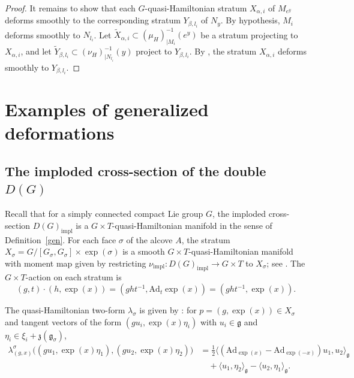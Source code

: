 \documentclass[reqno]{amsart}
\theoremstyle{plain}
\theoremstyle{definition}
\begin{document}
\begin{proof}
It remains to show that each $G$-quasi-Hamiltonian stratum $X_{\alpha,i}$ of $M_{e^y}$ deforms smoothly to the corresponding stratum $Y_{\beta,l_i}$ of $N_y$. By hypothesis, $M_i$ deforms smoothly to $N_{l_i}$. Let $\tilde{X}_{\alpha,i} \subset (\mu_H)_{|M_i}^{-1}(e^y)$ be a stratum projecting to $X_{\alpha,i}$, and let $\tilde{Y}_{\beta,l_i} \subset (\nu_H)_{|N_{l_i}}^{-1}(y)$ project to $Y_{\beta,l_i}$. By \cite[Theorem~3.3]{JMM2025deformations}, the stratum $X_{\alpha,i}$ deforms smoothly to $Y_{\beta,l_i}$.
\end{proof}

\section{Examples of generalized deformations}\label{sect 6}

\subsection{The imploded cross-section of the double $D(G)$}

Recall that for a simply connected compact Lie group $G$, the imploded cross-section $D(G)_{\mathrm{impl}}$ is a $G\times T$-quasi-Hamiltonian manifold in the sense of Definition~\ref{gen}. For each face $\sigma$ of the alcove $A$, the stratum $X_\sigma = G/[G_\sigma, G_\sigma] \times \exp(\sigma)$ is a smooth $G\times T$-quasi-Hamiltonian manifold with moment map given by restricting $\nu_{\mathrm{impl}}: D(G)_{\mathrm{impl}} \to G \times T$ to $X_\sigma$; see \cite[Lemma~4.5]{hurtubise2006group}. The $G\times T$-action on each stratum is
\begin{equation}\label{eq h}
(g,t) \cdot (h, \exp(x)) = (ght^{-1}, \mathrm{Ad}_t \exp(x)) = (ght^{-1}, \exp(x)).
\end{equation}

The quasi-Hamiltonian two-form $\lambda_\sigma$ is given by \cite[Subsection~1.6]{eshmatov2009group}: for $p = (g, \exp(x)) \in X_\sigma$ and tangent vectors of the form $(gu_i, \exp(x)\eta_i)$ with $u_i \in \mathfrak{g}$ and $\eta_i \in \xi_i + \mathfrak{z}(\mathfrak{g}_\sigma)$,
\begin{align*}
\lambda^\sigma_{(g,x)}\bigl((gu_1, \exp(x)\eta_1), (gu_2, \exp(x)\eta_2)\bigr) &= \frac{1}{2}\langle (\mathrm{Ad}_{\exp(x)} - \mathrm{Ad}_{\exp(-x)})u_1, u_2 \rangle_{\mathfrak{g}} \\
&\quad + \langle u_1, \eta_2 \rangle_{\mathfrak{g}} - \langle u_2, \eta_1 \rangle_{\mathfrak{g}}.
\end{align*}
\end{document}
